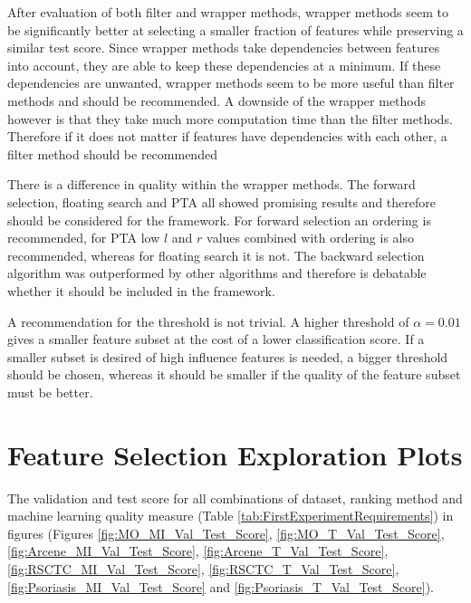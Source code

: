 \documentclass[10pt,a4paper]{article}
\begin{document}
	After evaluation of both filter and wrapper methods, wrapper methods seem to be significantly better at selecting a smaller fraction of features while preserving a similar test score. Since wrapper methods take dependencies between features into account, they are able to keep these dependencies at a minimum. If these dependencies are unwanted, wrapper methods seem to be more useful than filter methods and should be recommended. A downside of the wrapper methods however is that they take much more computation time than the filter methods. Therefore if it does not matter if features have dependencies with each other, a filter method should be recommended
	
	There is a difference in quality within the wrapper methods. The forward selection, floating search and PTA all showed promising results and therefore should be considered for the framework. For forward selection an ordering is recommended,  for PTA low $l$ and $r$ values combined with ordering is also recommended, whereas for floating search it is not. The backward selection algorithm was outperformed by other algorithms and therefore is debatable whether it should be included in the framework.
	
	A recommendation for the threshold is not trivial. A higher threshold of $\alpha = 0.01$ gives a smaller feature subset at the cost of a lower classification score. If a smaller subset is desired of high influence features is needed, a bigger threshold should be chosen, whereas it should be smaller if the quality of the feature subset must be better.
	
	 
	
	
	\appendix
	
	\section{Feature Selection Exploration Plots}
	\label{app:FeatureSelectionExplorationPlots}
	
	The validation and test score for all combinations of dataset, ranking method and machine learning quality measure (Table \ref{tab:FirstExperimentRequirements}) in figures (Figures \ref{fig:MO_MI_Val_Test_Score}, \ref{fig:MO_T_Val_Test_Score}, \ref{fig:Arcene_MI_Val_Test_Score}, \ref{fig:Arcene_T_Val_Test_Score}, \ref{fig:RSCTC_MI_Val_Test_Score}, \ref{fig:RSCTC_T_Val_Test_Score}, \ref{fig:Psoriasis_MI_Val_Test_Score} and \ref{fig:Psoriasis_T_Val_Test_Score}). 
	
\end{document}
